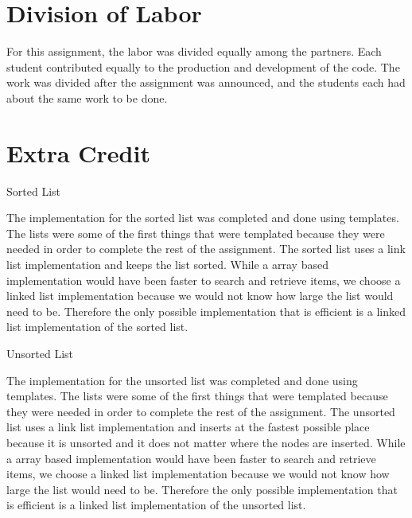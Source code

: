\documentclass[pdftex, 11pt]{article}
\begin{document}
\section{Division of Labor}

For this assignment, the labor was divided equally among the partners. Each student contributed equally to the
production and development of the code. The work was divided after the assignment was announced, and the students each
had about the same work to be done.

\section{Extra Credit}
\begin{description}
	\item{Sorted List}

		The implementation for the sorted list was completed and done using templates. The lists were some of the first
		things that were templated because they were needed in order to complete the rest of the assignment. The sorted
		list uses a link list implementation and keeps the list sorted. While a array based implementation would have
		been faster to search and retrieve items, we choose a linked list implementation because we would not know how
		large the list would need to be. Therefore the only possible implementation that is efficient is a linked list
		implementation of the sorted list.

	\item{Unsorted List}

		The implementation for the unsorted list was completed and done using templates. The lists were some of the
		first things that were templated because they were needed in order to complete the rest of the assignment. The
		unsorted list uses a link list implementation and inserts at the fastest possible place because it is unsorted
		and it does not matter where the nodes are inserted. While a array based implementation would have been faster
		to search and retrieve items, we choose a linked list implementation because we would not know how large the
		list would need to be. Therefore the only possible implementation that is efficient is a linked list
		implementation of the unsorted list.

\end{description}
\end{document}
